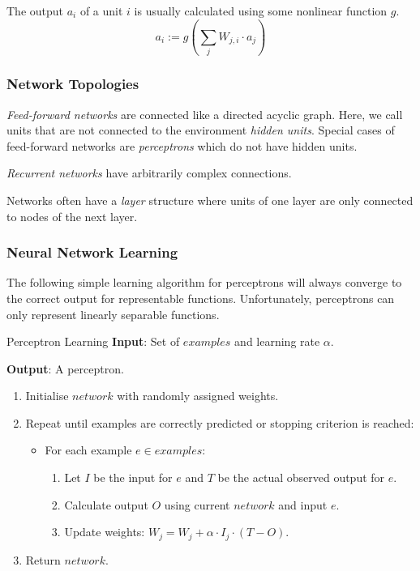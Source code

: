 \documentclass[english]{panikzettel}
\begin{document}
The output $a_i$ of a unit $i$ is usually calculated using some nonlinear function $g$.
\[ a_i := g \left( \sum_j W_{j,i} \cdot a_j \right) \]

\subsubsection{Network Topologies}

\emph{Feed-forward networks} are connected like a directed acyclic graph.
Here, we call units that are not connected to the environment \emph{hidden units}.
Special cases of feed-forward networks are \emph{perceptrons} which do not have hidden units.

\emph{Recurrent networks} have arbitrarily complex connections.

Networks often have a \emph{layer} structure where units of one layer are only connected to nodes of the next layer.

\subsubsection{Neural Network Learning}

The following simple learning algorithm for perceptrons will always converge to the correct output for representable functions.
Unfortunately, perceptrons can only represent linearly separable functions.

\begin{algo}{Perceptron Learning}
\textbf{Input}: Set of $examples$ and learning rate $\alpha$.

\textbf{Output}: A perceptron.
\tcblower
\begin{enumerate}
    \item Initialise $network$ with randomly assigned weights.
    \item Repeat until examples are correctly predicted or stopping criterion is reached:
        \begin{itemize}
            \item For each example $e \in examples$:
                \begin{enumerate}
                    \item Let $I$ be the input for $e$ and $T$ be the actual observed output for $e$.
                    \item Calculate output $O$ using current $network$ and input $e$.
                    \item Update weights: $W_j = W_j + \alpha \cdot I_j \cdot (T - O)$.
                \end{enumerate}
        \end{itemize}
    \item Return $network$.
\end{enumerate}
\end{algo}
\end{document}
